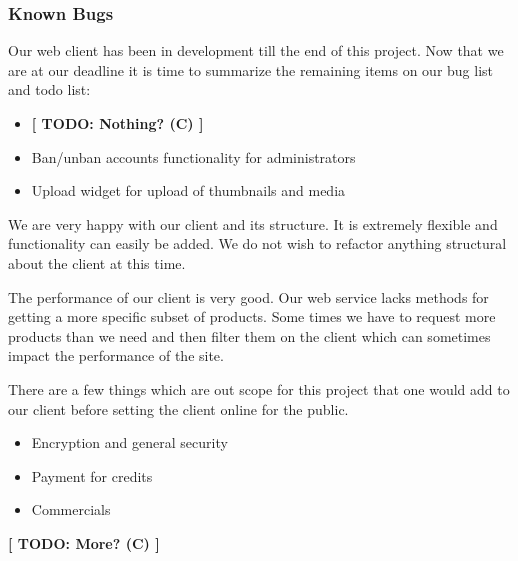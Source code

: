\subsubsection{Known Bugs}
Our web client has been in development till the end of this project. Now that we are at our deadline it is time to summarize the remaining items on our bug list and todo list:

\begin{itemize}
\item \textbf{[ TODO: Nothing? (C) ]}
\end{itemize}

\begin{itemize}
\item Ban/unban accounts functionality for administrators
\item Upload widget for upload of thumbnails and media
\end{itemize}

We are very happy with our client and its structure. It is extremely flexible and functionality can easily be added. We do not wish to refactor anything structural about the client at this time.

The performance of our client is very good. Our web service lacks methods for getting a more specific subset of products. Some times we have to request more products than we need and then filter them on the client which can sometimes impact the performance of the site.

There are a few things which are out scope for this project that one would add to our client before setting the client online for the public.

\begin{itemize}
\item Encryption and general security
\item Payment for credits
\item Commercials
\end{itemize}
\textbf{[ TODO: More? (C) ]}